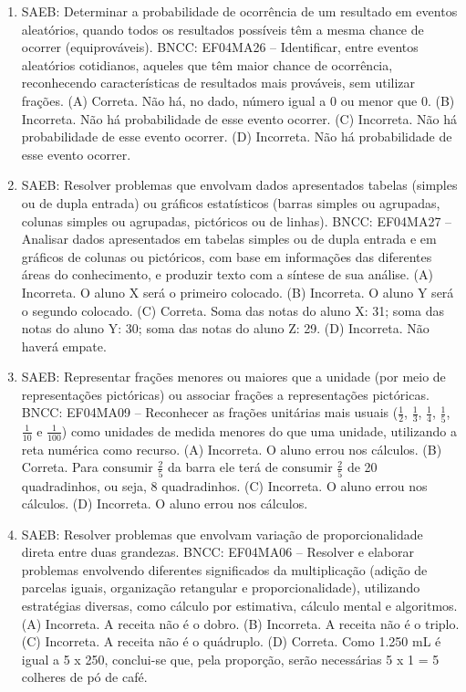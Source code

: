 \begin{enumerate}
\item
SAEB: Determinar a probabilidade de ocorrência de um
resultado em eventos aleatórios, quando todos os resultados possíveis
têm a mesma chance de ocorrer (equiprováveis).
BNCC: EF04MA26 -- Identificar, entre eventos aleatórios cotidianos, aqueles que têm maior chance de
ocorrência, reconhecendo características de resultados mais prováveis, sem utilizar frações.
(A) Correta. Não há, no dado, número igual a 0 ou menor que 0.
(B) Incorreta. Não há probabilidade de esse evento ocorrer.
(C) Incorreta. Não há probabilidade de esse evento ocorrer.
(D) Incorreta. Não há probabilidade de esse evento ocorrer.

\item
SAEB: Resolver problemas que envolvam dados apresentados
tabelas (simples ou de dupla entrada) ou gráficos estatísticos (barras
simples ou agrupadas, colunas simples ou agrupadas, pictóricos ou de
linhas).
BNCC: EF04MA27 -- Analisar dados apresentados em tabelas simples ou de dupla entrada e em gráficos de
colunas ou pictóricos, com base em informações das diferentes áreas do conhecimento, e produzir
texto com a síntese de sua análise.
(A) Incorreta. O aluno X será o primeiro colocado.
(B) Incorreta. O aluno Y será o segundo colocado.
(C) Correta. Soma das notas do aluno X: 31; soma das notas do aluno Y: 30; soma das notas do aluno Z: 29.
(D) Incorreta. Não haverá empate.

\item
SAEB: Representar frações menores ou maiores que a unidade
(por meio de representações pictóricas) ou associar frações a
representações pictóricas.
BNCC: EF04MA09 -- Reconhecer as frações unitárias mais usuais ($\frac{1}{2}$, $\frac{1}{3}$, $\frac{1}{4}$, $\frac{1}{5}$, $\frac{1}{10}$ e $\frac{1}{100}$) como
unidades de medida menores do que uma unidade, utilizando a reta numérica como recurso.
(A) Incorreta. O aluno errou nos cálculos.
(B) Correta. Para consumir $\frac{2}{5}$ da barra ele terá de consumir $\frac{2}{5}$ de 20 quadradinhos, ou seja, 8 quadradinhos.
(C) Incorreta. O aluno errou nos cálculos.
(D) Incorreta. O aluno errou nos cálculos.

\item
SAEB: Resolver problemas que envolvam variação de
proporcionalidade direta entre duas grandezas.
BNCC: EF04MA06 -- Resolver e elaborar problemas envolvendo diferentes significados da multiplicação
(adição de parcelas iguais, organização retangular e proporcionalidade), utilizando estratégias
diversas, como cálculo por estimativa, cálculo mental e algoritmos.
(A) Incorreta. A receita não é o dobro.
(B) Incorreta. A receita não é o triplo.
(C) Incorreta. A receita não é o quádruplo.
(D) Correta. Como 1.250 mL é igual a 5 x 250, conclui-se que, pela proporção, serão necessárias 5 x 1 = 5 colheres de pó de café.


\end{enumerate}

